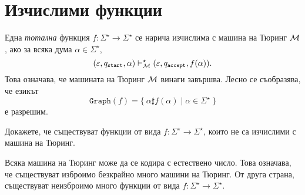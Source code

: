 \section{Изчислими функции}

Една {\em тотална} функция $f:\Sigma^\star \to \Sigma^\star$ се нарича изчислима с машина на Тюринг $\mathcal{M}$, ако 
за всяка дума $\alpha \in \Sigma^\star$,
\[(\varepsilon, q_{\texttt{start}}, \alpha) \vdash^\star_{\mathcal{M}} (\varepsilon, q_{\texttt{accept}}, f(\alpha)).\]
Това означава, че машината на Тюринг $\mathcal{M}$ винаги завършва. Лесно се съобразява, че езикът
\[\texttt{Graph}(f) = \{\ \alpha\sharp f(\alpha) \mid \alpha \in \Sigma^\star\ \}\]
е разрешим.

\begin{problem}
  Докажете, че съществуват функции от вида $f:\Sigma^\star\to\Sigma^\star$, които не са изчислими с машина на Тюринг.
\end{problem}
\begin{hint}
  Всяка машина на Тюринг може да се кодира с естествено число.
  Това означава, че съществуват изброимо безкрайно много машини на Тюринг.
  От друга страна, съществуват неизброимо много функции от вида $f:\Sigma^\star \to \Sigma^\star$.
\end{hint}


